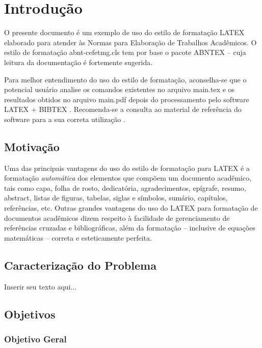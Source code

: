 %
%

\chapter{Introdução}\label{chap:introducao}

O presente documento é um exemplo de uso do estilo de formatação LATEX elaborado para atender às Normas para Elaboração de Trabalhos Acadêmicos. O estilo de formatação {\ttfamily abnt-cefetmg.cls} tem por base o pacote ABNTEX -- cuja leitura da documentação \cite{abnTeX2009} é fortemente sugerida.

Para melhor entendimento do uso do estilo de formatação, aconselha-se que o potencial usuário analise os comandos existentes no arquivo {\ttfamily main.tex} e os resultados obtidos no arquivo {\ttfamily main.pdf} depois do processamento pelo software LATEX + BIBTEX \cite{LaTeX2009,BibTeX2009}. Recomenda-se a consulta ao material de referência do software para a sua correta utilização \cite{Lamport1986,Buerger1989,Kopka2003,Mittelbach2004}.

\section{Motivação}
\label{sec:motivacao}

Uma das principais vantagens do uso do estilo de formatação para LATEX é a formatação \textit{automática} dos elementos que compõem um documento acadêmico, tais como capa, folha de rosto, dedicatória, agradecimentos, epígrafe, resumo, abstract, listas de figuras, tabelas, siglas e símbolos, sumário, capítulos, referências, etc. Outras grandes vantagens do uso do LATEX para formatação de documentos acadêmicos dizem respeito à facilidade de gerenciamento de referências cruzadas e bibliográficas, além da formatação -- inclusive de equações matemáticas -- correta e esteticamente perfeita.

\section{Caracterização do Problema}
\label{sec:caracProblema}

Inserir seu texto aqui...

\section{Objetivos}
\label{sec:objetivos}

\subsection{Objetivo Geral}
\label{subsec:objetivoGeral}


